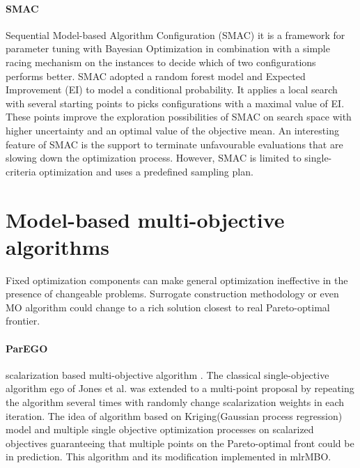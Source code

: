         \paragraph{SMAC} Sequential Model-based Algorithm Configuration (SMAC)\cite{HutterHL11, smac-2017} it is a framework for parameter tuning with Bayesian Optimization in combination with a simple racing mechanism on the instances to decide which of two configurations performs better.
        SMAC adopted a random forest model and Expected Improvement (EI) to model a conditional probability. It applies a local search with several starting points to picks configurations with a maximal value of EI. These points improve the exploration possibilities of SMAC on search space with higher uncertainty and an optimal value of the objective mean. 
        An interesting feature of SMAC is the support to terminate unfavourable evaluations that are slowing down the optimization process. However, SMAC is limited to single-criteria optimization and uses a predefined sampling plan.
        
        


    \section{Model-based multi-objective algorithms}
        Fixed optimization components can make general optimization ineffective in the presence of changeable problems. Surrogate construction methodology or even MO algorithm could change to a rich solution closest to real Pareto-optimal frontier.

        \paragraph{ParEGO}\label{alg:ParEGO} scalarization based multi-objective algorithm \cite{Knowles06}. The classical single-objective algorithm \gls{ego} \cite{JonesSW98} of Jones et al. was extended to a multi-point proposal by repeating the algorithm several times with randomly change scalarization weights in each iteration.  The idea of algorithm based on Kriging(Gaussian process regression) model and multiple single objective optimization processes on scalarized objectives guaranteeing that multiple points on the Pareto-optimal front could be in prediction. This algorithm and its modification implemented in mlrMBO\cite{BischlmlrMBO}.


